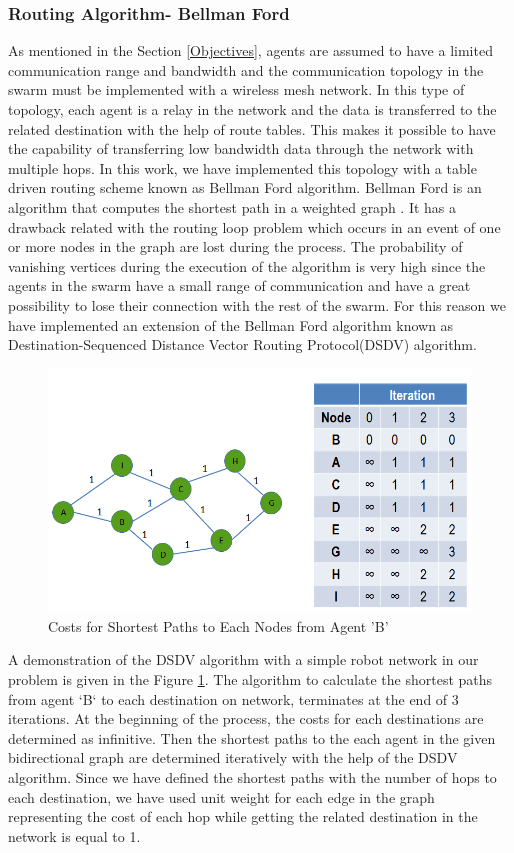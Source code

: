 \subsubsection{Routing Algorithm- Bellman Ford}
As mentioned in the Section \ref{Objectives}, agents are assumed to have a limited communication range and bandwidth and the communication topology in the swarm must be implemented with a wireless mesh network. In this type of topology, each agent is a relay in the network and the data is transferred to the related destination with the help of route tables. This makes it possible to have the capability of transferring low bandwidth data through the network with multiple hops.  In this work, we have implemented this topology with a table driven routing scheme known as Bellman Ford algorithm. Bellman Ford is an algorithm that computes the shortest path in a weighted graph \cite{wiki_bellman}. It has a drawback related with the routing loop problem which occurs in an event of one or more nodes in the graph are lost during the process. The probability of vanishing vertices during the execution of the algorithm is very high since the agents in the swarm have a small range of communication and have a great possibility to lose their connection with the rest of the swarm. For this reason we have implemented an extension of the Bellman Ford algorithm known as Destination-Sequenced Distance Vector Routing Protocol(DSDV) algorithm.  
	
\begin{figure}[H]
\caption{Costs for Shortest Paths to Each Nodes from Agent 'B'} \label{bellman_ref}
\centering
\includegraphics[scale = 0.50]{bellman}
\end{figure}

A demonstration of the DSDV algorithm with a simple robot network in our problem is given in the Figure \ref{bellman_ref}. The algorithm to calculate the shortest paths from agent `B` to each destination on network, terminates at the end of 3 iterations. At the beginning of the process, the costs for each destinations are determined as infinitive. Then the shortest paths to the each agent in the given bidirectional graph are determined iteratively with the help of the DSDV algorithm. Since we have defined the shortest paths with the number of hops to each destination, we have used unit weight for each edge in the graph representing the cost of each hop while getting the related destination in the network is equal to 1. 

